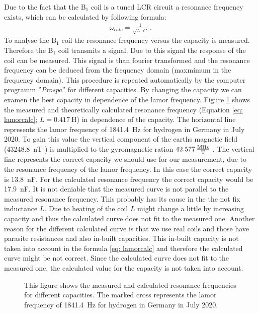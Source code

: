 Due to the fact that the B$_1$ coil is a tuned LCR circuit a resonance frequency exists, which can be calculated by following formula:
\begin{align}
    \omega_{calc} = \frac{1}{\sqrt{L \cdot C}} \ .
    \label{eq: lamorcalc}
\end{align}
To analyse the B$_1$ coil the resonance frequency versus the capacity is measured. Therefore the B$_1$ coil transmits a signal. Due to this signal the response of the coil can be measured. This signal is than fourier transformed and the resonance frequency can be deduced from the frequency domain (maxmimum in the frequency domain). This procedure is repeated automatically by the computer programm ''\textit{Prospa}'' for different capacities. By changing the capacity we can examen the best capacity in dependence of the lamor frequency. Figure \ref{fig: Coilanalyse} shows the measured and theoretically calculated resonance frequency (Equation \ref{eq: lamorcalc}; $L = \SI{0.417}{\henry}$) in dependence of the capacity. The horizontal line represents the lamor frequency of \SI{1841.4}{\hertz} for hydrogen in Germany in July 2020. To gain this value the vertical component of the earths magnetic field (\SI{43248.8}{\nano \tesla} \cite{magnetfeld}) is multiplied to the gyromagnetic ration $\SI{42.577}{\frac{\mega \hertz}{\tesla}}$ \cite{magnetfeld}. The vertical line represents the correct capacity we should use for our measurement, due to the resonance frequency of the lamor frequency. In this case the correct capacity is \SI{13.8}{\nano \farad}. For the calculated resonance frequency the correct capacity would be \SI{17.9}{\nano \farad}. It is not deniable that the measured curve is not parallel to the measured resonance frequency. This probably has its cause in the the not fix inductance $L$. Due to heating of the coil $L$ might change a little by increasing capacity and thus the calculated curve does not fit to the measured one. Another reason for the different calculated curve is that we use real coils and those have parasite resistances and also in-built capacities. This in-built capacity is not taken into account in the formula \ref{eq: lamorcalc} and therefore the calculated curve might be not correct. Since the calculated curve does not fit to the measured one, the calculated value for the capacity is not taken into account.

\begin{figure}[H]
    \centering
    
    \caption[This figure shows the measured and calculated resonance frequencies for different capacities.]{This figure shows the measured and calculated resonance frequencies for different capacities. The marked cross represents the lamor frequency of \SI{1841.4}{\hertz} for hydrogen in Germany in July 2020.}
    \label{fig: Coilanalyse}
\end{figure}
